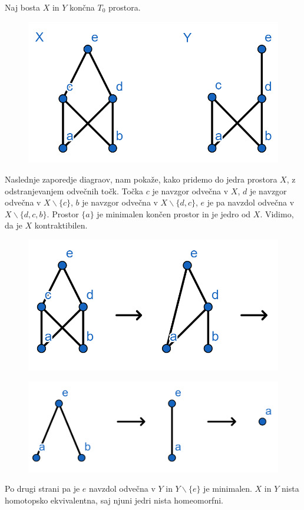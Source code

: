 \documentclass[mat1]{fmfdelo}
\begin{document}
\begin{primer}
    Naj bosta $X$ in $Y$ končna $T_0$ prostora.
    \begin{figure}[h!]
        \centering
        \includegraphics[width=0.5\linewidth]{hasse0.png}
    \end{figure}

    Naslednje zaporedje diagraov, nam pokaže, kako pridemo do jedra prostora $X$, z odstranjevanjem odvečnih točk. Točka $c$ je navzgor odvečna v $X$, $d$ je navzgor odvečna v $X\backslash\{c\}$, $b$ je navzgor odvečna v $X\backslash\{d,c\}$, $e$ je pa navzdol odvečna v $X\backslash\{d,c,b\}$. Prostor $\{a\}$ je minimalen končen prostor in je jedro od $X$. Vidimo, da je $X$ kontraktibilen.
    
    \begin{figure}[h!]
        \centering
        \includegraphics[width=0.5\linewidth]{hasse1.png}
    \end{figure}
     
    \begin{figure}[h!]
        \centering
        \includegraphics[width=0.5\linewidth]{hasse2.png}
    \end{figure}

    Po drugi strani pa je $e$ navzdol odvečna v $Y$ in $Y\backslash \{e\}$ je minimalen. $X$ in $Y$ nista homotopsko ekvivalentna, saj njuni jedri nista homeomorfni.
    

    
\end{primer}
\end{document}
